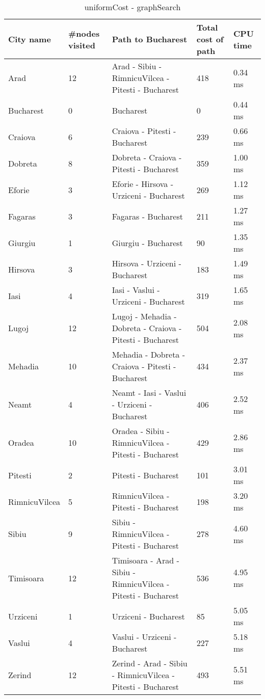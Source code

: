 \documentclass[a4paper]{article}
\begin{document}
\begin {table}[H]
\caption {uniformCost - graphSearch}
\begin{center}
\begin{tabular}{ | l | l |  p{5cm} | l | l |} \hline
City name & \multicolumn{1}{l|}{\#nodes visited} & \multicolumn{1}{l|}{Path to Bucharest} & \multicolumn{1}{l|}{Total cost of path} & \multicolumn{1}{l|}{CPU time} \\ \hline
Arad & 12 & Arad - Sibiu - RimnicuVilcea - Pitesti - Bucharest & 418 & 0.34 ms \\ \hline
Bucharest & 0 & Bucharest & 0 & 0.44 ms \\ \hline
Craiova & 6 & Craiova - Pitesti - Bucharest & 239 & 0.66 ms \\ \hline
Dobreta & 8 & Dobreta - Craiova - Pitesti - Bucharest & 359 & 1.00 ms \\ \hline
Eforie & 3 & Eforie - Hirsova - Urziceni - Bucharest & 269 & 1.12 ms \\ \hline
Fagaras & 3 & Fagaras - Bucharest & 211 & 1.27 ms \\ \hline
Giurgiu & 1 & Giurgiu - Bucharest & 90 & 1.35 ms \\ \hline
Hirsova & 3 & Hirsova - Urziceni - Bucharest & 183 & 1.49 ms \\ \hline
Iasi & 4 & Iasi - Vaslui - Urziceni - Bucharest & 319 & 1.65 ms \\ \hline
Lugoj & 12 & Lugoj - Mehadia - Dobreta - Craiova - Pitesti - Bucharest & 504 & 2.08 ms \\ \hline
Mehadia & 10 & Mehadia - Dobreta - Craiova - Pitesti - Bucharest & 434 & 2.37 ms \\ \hline
Neamt & 4 & Neamt - Iasi - Vaslui - Urziceni - Bucharest & 406 & 2.52 ms \\ \hline
Oradea & 10 & Oradea - Sibiu - RimnicuVilcea - Pitesti - Bucharest & 429 & 2.86 ms \\ \hline
Pitesti & 2 & Pitesti - Bucharest & 101 & 3.01 ms \\ \hline
RimnicuVilcea & 5 & RimnicuVilcea - Pitesti - Bucharest & 198 & 3.20 ms \\ \hline
Sibiu & 9 & Sibiu - RimnicuVilcea - Pitesti - Bucharest & 278 & 4.60 ms \\ \hline
Timisoara & 12 & Timisoara - Arad - Sibiu - RimnicuVilcea - Pitesti - Bucharest & 536 & 4.95 ms \\ \hline
Urziceni & 1 & Urziceni - Bucharest & 85 & 5.05 ms \\ \hline
Vaslui & 4 & Vaslui - Urziceni - Bucharest & 227 & 5.18 ms \\ \hline
Zerind & 12 & Zerind - Arad - Sibiu - RimnicuVilcea - Pitesti - Bucharest & 493 & 5.51 ms \\ \hline
\end{tabular}
\end{center}
\end {table}
\end{document}
